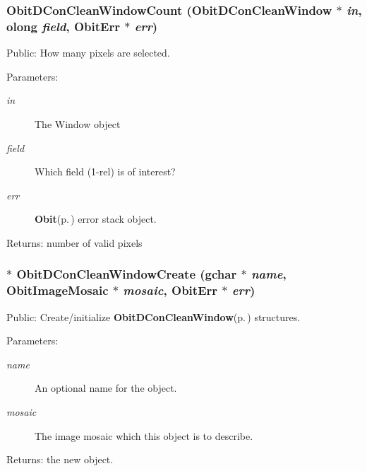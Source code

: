 \subsubsection{ Obit\-DCon\-Clean\-Window\-Count ({\bf Obit\-DCon\-Clean\-Window} $\ast$ {\em in}, {\bf olong} {\em field}, {\bf Obit\-Err} $\ast$ {\em err})}\label{ObitDConCleanWindow_8h_a44}


Public: How many pixels are selected. 

\begin{Desc}
\item[Parameters:]
\begin{description}
\item[{\em in}]The Window object \item[{\em field}]Which field (1-rel) is of interest? \item[{\em err}]{\bf Obit}{\rm (p.\,\pageref{structObit})} error stack object. \end{description}
\end{Desc}
\begin{Desc}
\item[Returns:]number of valid pixels \end{Desc}
\subsubsection{$\ast$ Obit\-DCon\-Clean\-Window\-Create (gchar $\ast$ {\em name}, {\bf Obit\-Image\-Mosaic} $\ast$ {\em mosaic}, {\bf Obit\-Err} $\ast$ {\em err})}\label{ObitDConCleanWindow_8h_a27}


Public: Create/initialize {\bf Obit\-DCon\-Clean\-Window}{\rm (p.\,\pageref{structObitDConCleanWindow})} structures. 

\begin{Desc}
\item[Parameters:]
\begin{description}
\item[{\em name}]An optional name for the object. \item[{\em mosaic}]The image mosaic which this object is to describe. \end{description}
\end{Desc}
\begin{Desc}
\item[Returns:]the new object. \end{Desc}
